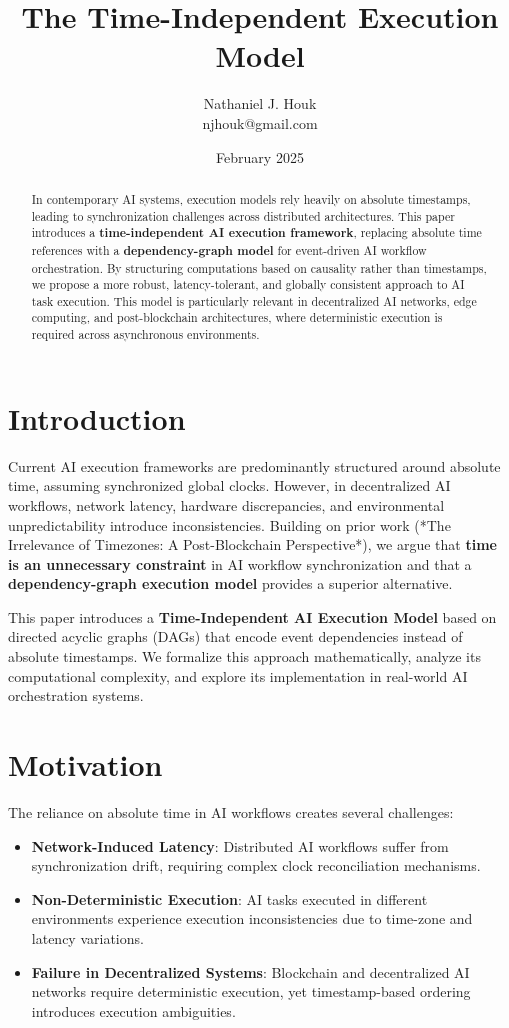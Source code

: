 \documentclass{article}
\title{The Time-Independent Execution Model}
\author{Nathaniel J. Houk \\ njhouk@gmail.com}
\date{February 2025}
\begin{document}
\maketitle
\tableofcontents

\begin{abstract}
In contemporary AI systems, execution models rely heavily on absolute timestamps, leading to synchronization challenges across distributed architectures. This paper introduces a \textbf{time-independent AI execution framework}, replacing absolute time references with a \textbf{dependency-graph model} for event-driven AI workflow orchestration. By structuring computations based on causality rather than timestamps, we propose a more robust, latency-tolerant, and globally consistent approach to AI task execution. This model is particularly relevant in decentralized AI networks, edge computing, and post-blockchain architectures, where deterministic execution is required across asynchronous environments.
\end{abstract}

\section{Introduction}
Current AI execution frameworks are predominantly structured around absolute time, assuming synchronized global clocks. However, in decentralized AI workflows, network latency, hardware discrepancies, and environmental unpredictability introduce inconsistencies. Building on prior work (*The Irrelevance of Timezones: A Post-Blockchain Perspective*), we argue that \textbf{time is an unnecessary constraint} in AI workflow synchronization and that a \textbf{dependency-graph execution model} provides a superior alternative.

This paper introduces a \textbf{Time-Independent AI Execution Model} based on directed acyclic graphs (DAGs) that encode event dependencies instead of absolute timestamps. We formalize this approach mathematically, analyze its computational complexity, and explore its implementation in real-world AI orchestration systems.

\section{Motivation}
The reliance on absolute time in AI workflows creates several challenges:
\begin{itemize}
    \item \textbf{Network-Induced Latency}: Distributed AI workflows suffer from synchronization drift, requiring complex clock reconciliation mechanisms.
    \item \textbf{Non-Deterministic Execution}: AI tasks executed in different environments experience execution inconsistencies due to time-zone and latency variations.
    \item \textbf{Failure in Decentralized Systems}: Blockchain and decentralized AI networks require deterministic execution, yet timestamp-based ordering introduces execution ambiguities.
\end{itemize}
\end{document}
